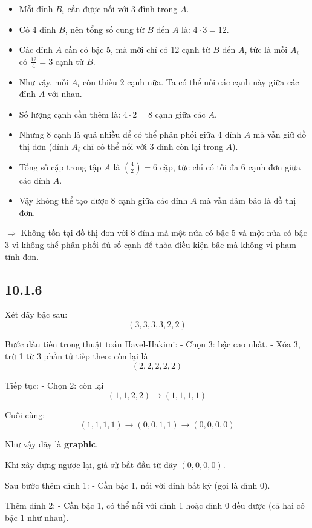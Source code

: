 \documentclass{article}
\begin{document}
	\begin{itemize}
		\item Mỗi đỉnh $B_i$ cần được nối với 3 đỉnh trong $A$.
		\item Có 4 đỉnh $B$, nên tổng số cung từ $B$ đến $A$ là: $4 \cdot 3 = 12$.
		\item Các đỉnh $A$ cần có bậc 5, mà mới chỉ có 12 cạnh từ $B$ đến $A$, tức là mỗi $A_i$ có $\frac{12}{4} = 3$ cạnh từ $B$.
		\item Như vậy, mỗi $A_i$ còn thiếu 2 cạnh nữa. Ta có thể nối các cạnh này giữa các đỉnh $A$ với nhau.
		\item Số lượng cạnh cần thêm là: $4 \cdot 2 = 8$ cạnh giữa các $A$.
		\item Nhưng 8 cạnh là quá nhiều để có thể phân phối giữa 4 đỉnh $A$ mà vẫn giữ đồ thị đơn (đỉnh $A_i$ chỉ có thể nối với 3 đỉnh còn lại trong $A$).
		\item Tổng số cặp trong tập $A$ là $\binom{4}{2} = 6$ cặp, tức chỉ có tối đa 6 cạnh đơn giữa các đỉnh $A$.
		\item Vậy không thể tạo được 8 cạnh giữa các đỉnh $A$ mà vẫn đảm bảo là đồ thị đơn.
	\end{itemize}
	
	$\Rightarrow$  Không tồn tại đồ thị đơn với 8 đỉnh mà một nửa có bậc 5 và một nửa có bậc 3 vì không thể phân phối đủ số cạnh để thỏa điều kiện bậc mà không vi phạm tính đơn.
	
	\subsection*{10.1.6}
	Xét dãy bậc sau:
	\[
	(3, 3, 3, 3, 2, 2)
	\]
	
	Bước đầu tiên trong thuật toán Havel-Hakimi:
	- Chọn 3: bậc cao nhất.
	- Xóa 3, trừ 1 từ 3 phần tử tiếp theo: còn lại là
	\[
	(2, 2, 2, 2, 2)
	\]
	
	Tiếp tục:
	- Chọn 2: còn lại
	\[
	(1, 1, 2, 2)
	\rightarrow (1, 1, 1, 1)
	\]
	
	Cuối cùng:
	\[
	(1, 1, 1, 1) \rightarrow (0, 0, 1, 1) \rightarrow (0, 0, 0, 0)
	\]
	
	Như vậy dãy là \textbf{graphic}.
	
	Khi xây dựng ngược lại, giả sử bắt đầu từ dãy $(0,0,0,0)$.
	
	Sau bước thêm đỉnh 1:
	- Cần bậc 1, nối với đỉnh bất kỳ (gọi là đỉnh 0).
	
	Thêm đỉnh 2:
	- Cần bậc 1, có thể nối với đỉnh 1 hoặc đỉnh 0 đều được (cả hai có bậc 1 như nhau).
	
\end{document}
